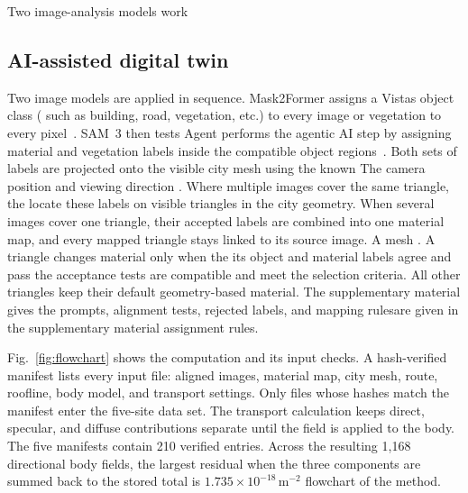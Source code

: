 \documentclass{IEEEoj} %
\providecommand{\DIFadd}[1]{{\protect\color{blue} \sf #1}} %
\providecommand{\DIFdel}[1]{{\protect\color{red} \scriptsize #1}} %
\providecommand{\DIFaddbegin}{} %
\providecommand{\DIFaddend}{} %
\providecommand{\DIFdelbegin}{} %
\providecommand{\DIFdelend}{} %
\begin{document}
\DIFdelbegin \DIFdel{Two image-analysis models work }\DIFdelend \DIFaddbegin \subsection{\DIFadd{AI-assisted digital twin}}
\label{sec:digital-twin}

\DIFadd{Two image models are applied }\DIFaddend in sequence. Mask2Former assigns a Vistas object
class \DIFdelbegin \DIFdel{(}\DIFdelend \DIFaddbegin \DIFadd{such as }\DIFaddend building, road, \DIFdelbegin \DIFdel{vegetation, etc.) to every image
}\DIFdelend \DIFaddbegin \DIFadd{or vegetation to every }\DIFaddend pixel~\cite{mask2former,vistas}.
SAM~3 \DIFdelbegin \DIFdel{then tests }\DIFdelend \DIFaddbegin \DIFadd{Agent performs the agentic AI step by assigning }\DIFaddend material and vegetation
labels inside \DIFdelbegin \DIFdel{the }\DIFdelend compatible object regions~\cite{sam3}. \DIFdelbegin \DIFdel{Both sets of labels are
projected onto the visible city mesh using the known }\DIFdelend \DIFaddbegin \DIFadd{The }\DIFaddend camera position and
viewing direction \DIFdelbegin \DIFdel{. Where multiple images cover the same triangle, the }\DIFdelend \DIFaddbegin \DIFadd{locate these labels on visible triangles in the city geometry. When several images cover one
triangle, their accepted }\DIFaddend labels are combined\DIFdelbegin \DIFdel{into one material map, and every mapped triangle stays linked to its
source image. A mesh }\DIFdelend \DIFaddbegin \DIFadd{. A }\DIFaddend triangle changes material only
when \DIFdelbegin \DIFdel{the }\DIFdelend \DIFaddbegin \DIFadd{its }\DIFaddend object and material labels \DIFdelbegin \DIFdel{agree and pass the acceptance tests}\DIFdelend \DIFaddbegin \DIFadd{are compatible and meet the selection
criteria}\DIFaddend . All other triangles keep their \DIFdelbegin \DIFdel{default }\DIFdelend \DIFaddbegin \DIFadd{geometry-based }\DIFaddend material. The
\DIFaddbegin \DIFadd{supplementary material gives the }\DIFaddend prompts, alignment tests, rejected labels, and
\DIFdelbegin \DIFdel{mapping rulesare given in the supplementary material}\DIFdelend \DIFaddbegin \DIFadd{assignment rules}\DIFaddend .

Fig.~\ref{fig:flowchart} shows the \DIFdelbegin \DIFdel{computation and its input checks. A
hash-verified manifest lists every input file: aligned images, material map,
city mesh, route, roofline, body model, and transport settings. Only files whose
hashes match the manifest enter the five-site data set. The transport
calculation keeps direct, specular, and diffuse contributions separate until
the field is applied to the body. The five manifests contain 210 verified entries. Across the
resulting 1,168 directional body fields, the largest residual when the three
components are summed back to the stored total is
$1.735\times10^{-18}\,\mathrm{m}^{-2}$}\DIFdelend \DIFaddbegin \DIFadd{flowchart of the method}\DIFaddend .
\end{document}
